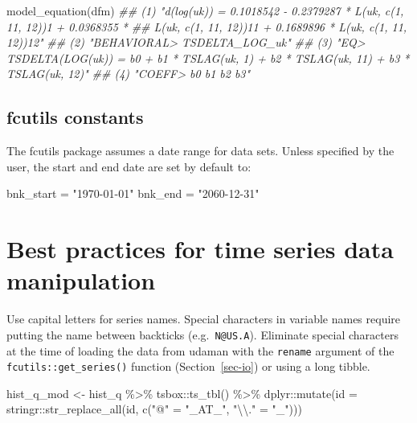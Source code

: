 \documentclass[
  letterpaper,
  DIV=11,
  numbers=noendperiod]{scrreport}
\newenvironment{Shaded}{\begin{snugshade}}{\end{snugshade}}
\newcommand{\AttributeTok}[1]{\textcolor[rgb]{0.40,0.45,0.13}{#1}}
\newcommand{\DocumentationTok}[1]{\textcolor[rgb]{0.37,0.37,0.37}{\textit{#1}}}
\newcommand{\FunctionTok}[1]{\textcolor[rgb]{0.28,0.35,0.67}{#1}}
\newcommand{\NormalTok}[1]{\textcolor[rgb]{0.00,0.23,0.31}{#1}}
\newcommand{\OtherTok}[1]{\textcolor[rgb]{0.00,0.23,0.31}{#1}}
\newcommand{\SpecialCharTok}[1]{\textcolor[rgb]{0.37,0.37,0.37}{#1}}
\newcommand{\StringTok}[1]{\textcolor[rgb]{0.13,0.47,0.30}{#1}}
\begin{document}
\begin{Shaded}
\begin{Highlighting}[]
\FunctionTok{model\_equation}\NormalTok{(dfm)}
\DocumentationTok{\#\# (1) "d(log(uk)) = 0.1018542 {-} 0.2379287 * L(uk, c(1, 11, 12))1 + 0.0368355 *}
\DocumentationTok{\#\# L(uk, c(1, 11, 12))11 + 0.1689896 * L(uk, c(1, 11, 12))12"}
\DocumentationTok{\#\# (2) "BEHAVIORAL\textgreater{} TSDELTA\_LOG\_uk"}
\DocumentationTok{\#\# (3) "EQ\textgreater{} TSDELTA(LOG(uk)) = b0 + b1 * TSLAG(uk, 1) + b2 * TSLAG(uk, 11) + b3 * TSLAG(uk, 12)"}
\DocumentationTok{\#\# (4) "COEFF\textgreater{} b0 b1 b2 b3"}
\end{Highlighting}
\end{Shaded}

\section{fcutils constants}\label{fcutils-constants}

The fcutils package assumes a date range for data sets. Unless specified
by the user, the start and end date are set by default to:

\begin{Shaded}
\begin{Highlighting}[]
\NormalTok{bnk\_start }\OtherTok{=} \StringTok{"1970{-}01{-}01"}
\NormalTok{bnk\_end }\OtherTok{=} \StringTok{"2060{-}12{-}31"}
\end{Highlighting}
\end{Shaded}


\chapter{Best practices for time series data
manipulation}\label{sec-bestpract}

Use capital letters for series names. Special characters in variable
names require putting the name between backticks (e.g.~\texttt{N@US.A}).
Eliminate special characters at the time of loading the data from udaman
with the \texttt{rename} argument of the \texttt{fcutils::get\_series()}
function (Section~\ref{sec-io}) or using a long tibble.

\begin{Shaded}
\begin{Highlighting}[]
\NormalTok{hist\_q\_mod }\OtherTok{\textless{}{-}}\NormalTok{ hist\_q }\SpecialCharTok{\%\textgreater{}\%}
\NormalTok{  tsbox}\SpecialCharTok{::}\FunctionTok{ts\_tbl}\NormalTok{() }\SpecialCharTok{\%\textgreater{}\%}
\NormalTok{  dplyr}\SpecialCharTok{::}\FunctionTok{mutate}\NormalTok{(}\AttributeTok{id =}\NormalTok{ stringr}\SpecialCharTok{::}\FunctionTok{str\_replace\_all}\NormalTok{(id, }\FunctionTok{c}\NormalTok{(}\StringTok{"@"} \OtherTok{=} \StringTok{"\_AT\_"}\NormalTok{, }\StringTok{"}\SpecialCharTok{\textbackslash{}\textbackslash{}}\StringTok{."} \OtherTok{=} \StringTok{"\_"}\NormalTok{)))}
\end{Highlighting}
\end{Shaded}
\end{document}
